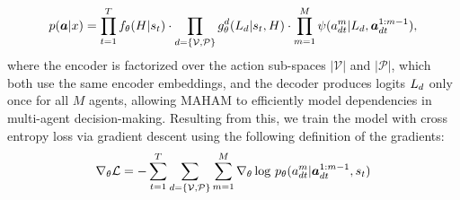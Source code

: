\begin{align}
    p(\bm{a}|x) = \prod_{t=1}^T f_\theta(H|s_t) \cdot \prod_{d=\{\mathcal{V}, \mathcal{P}\}}  g^d_\theta(L_d|s_t, H) \cdot \prod_{{m}=1}^{M} \psi(a_{dt}^{m} | L_d, \bm{a}_{dt}^{1:m-1}),
\end{align}
where the encoder is factorized over the action sub-spaces $|\mathcal{V}|$ and $|\mathcal{P}|$, which both use the same encoder embeddings, and the decoder produces logits $L_d$ only once for all $M$ agents, allowing MAHAM to efficiently model dependencies in multi-agent decision-making. Resulting from this, we train the model with cross entropy loss via gradient descent using the following definition of the gradients:
\begin{align}
    \nabla_\theta \mathcal{L} = - \sum_{t=1}^T \sum_{d=\{\mathcal{V}, \mathcal{P}\}} \sum_{{m}=1}^{M} \nabla_\theta \log \, p_\theta(a_{dt}^{m} | \bm{a}_{dt}^{1:m-1}, s_t)
\end{align}
